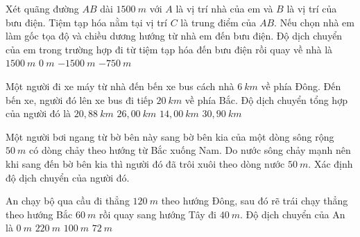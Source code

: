 \begin{vidu}
Xét quãng đường $AB$ dài $1500\ m$ với $A$ là vị trí nhà của em và $B$ là vị trí của bưu điện. Tiệm tạp hóa nằm tại vị trí $C$ là trung điểm của $AB$. Nếu chọn nhà em làm gốc tọa độ và chiều dương hướng từ nhà em đến bưu điện. Độ dịch chuyển của em trong trường hợp đi từ tiệm tạp hóa đến bưu điện rồi quay về nhà là
\choice
{$1500\ m$}
{$0\ m$}
{$-1500\ m$}
{\True $-750\ m$}

\end{vidu}

\begin{vidu}%
Một người đi xe máy từ nhà đến bến xe bus cách nhà $6\ km$ về phía Đông. Đến bến xe, người đó lên xe bus đi tiếp $20\ km$ về phía Bắc. Độ dịch chuyển tổng hợp của người đó là
\choice
{\True $20,88\ km$}
{$26,00\ km$}
{$14,00\ km$}
{$30,90\ km$}
\end{vidu}

\begin{vidu}
Một người bơi ngang từ bờ bên này sang bờ bên kia của một dòng sông rộng $50\ m$ có dòng chảy theo hướng từ Bắc xuống Nam. Do nước sông chảy mạnh nên khi sang đến bờ bên kia thì người đó đã trôi xuôi theo dòng nước $50\ m$. Xác định độ dịch chuyển của người đó.
\end{vidu}
\begin{vidu}
An chạy bộ qua cầu đi thẳng $120\ m$ theo hướng Đông, sau đó rẽ trái chạy thẳng theo hướng Bắc $60\ m$ rồi quay sang hướng Tây đi $40\ m$. Độ dịch chuyển của An là
\choice
{$0\ m$}
{$220\ m$}
{\True $100\ m$}
{$72\ m$}
\loigiai{
}
\end{vidu}

